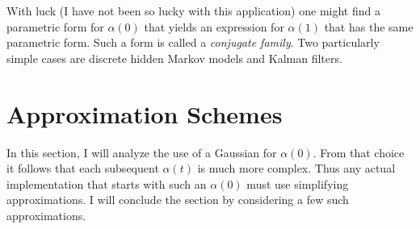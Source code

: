 \documentclass[12pt]{article}
\newcommand{\ti}[2]{{#1}{(#2)}}                         %
\begin{document}
With luck (I have not been so lucky with this application) one might
find a parametric form for $\alpha(0)$ that yields an expression for
$\alpha(1)$ that has the same parametric form.  Such a form is called
a \emph{conjugate family}.  Two particularly simple cases are discrete
hidden Markov models and Kalman filters.

\section{Approximation Schemes}
\label{sec:approximation}

In this section, I will analyze the use of a Gaussian for $\alpha(0)$.
From that choice it follows that each subsequent $\ti{\alpha}{t}$ is much
more complex.  Thus any actual implementation that starts with such an
$\alpha(0)$ must use simplifying approximations.  I will conclude the
section by considering a few such approximations.
\end{document}

